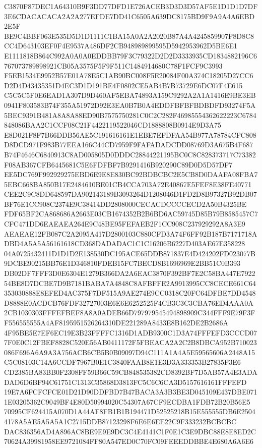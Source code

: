 \documentclass[UTF8,fontset=fandol,zihao=-4,a4paper]{ctexart}
\begin{document}
{{C3870F87DEC1A64310B9F3DD77DFD1E726ACEB3D3D3D57AF5E1D1D1D7DF3E6CDACACACA2A2A277EFDE7DD41C6505A639DC8175BD9F9A9A4A6EBD2E5F
BE9C4BBF063E535D5D1D1111C1BA15A0A2A2020B87A4A4245859907F8D8C8CC4D643103EF0F4E9537A486DF2CB948989899595D5942953962D5BE6E1
E1111818B864C992A0A0A0EDDBB79F3C79322D2D2D3333935CD1834882196C6767073789898921CB05A3575F5F9F511C1484914680C78F1FCF9C3993
F5EB1534E9952B57E01A78E5C1AB90BC008F5E20084F00A374C18205D27CC6D2D4D43435351D4EC3D1D191BE4F0802CE5AB4B7B73729E6DC07F4E615
C5C5C5F0E6EAD1A307D9D460AF5EBA74893A159C9292A2A1A1416E9BE3EB0941F803583B74F355A51972D92E3EA0B7B0A4EDDFBFBFBDBDFD93274F5A
5BEC9391B481A8A8A88ED90B7575750281C0C2C282F46985554362622223C6784848086BAA2C1CCF08C21F4422119522046CD1888808B0914E9D3A75
E8D021F8F7B66DDB56AE5C191616161E1EBE7EFDFAA54B977A78784CFC808D8DCD971F983B77EEA166C44CD7959F9FAFADADCDD08769D3A675B4F687
B74F4646C6840913C8AD005805D0DDDC28844221195BC0C8C828373717C73382F08AB367CFB6445681C5E6FDFBF7B9291416B920290C89D0D5D57DF7
EE5DC769F992929275EBD6E9E8E830BC92BDBCBC2E5CB8D0DAAFA08FBA75EBC668BA850B17E2484610BE01CB4CCA703A72E40867E5FEF8E38FE40771
CEE2C9C8DD648597DA902143189B3093264D1208046D1FD2D8B97327B92DB07BF76E1CC908C2374E9C38414DD2808000CECACDCCCCECD2A50B4325BE
FDF65BF2CA868686A2663E03CB1674352B2B6BD6AC59745D85B79B8585457C7CFC471DD6EAEAEA264E9C48BE95FEFAEB2F1CC908C237929292A8A3E9
AEAEAE12FB087C2A2095A417D2800103C880CFD3A74F6FF92B187B7171718ADBD4A5A5A56161618CD368DADADAC1C1C16206B6227D403AE67E358228
04A0725432411D1D1D2E138530DC195ACE65DDB871837E4D424202FD023077B9DCBE90215BB76E1D346810FDEB15FC7BECD8B1696969E2BB51C0B393
DB02DF7FFF3D0E6304E1279B366DA2A6EAC3870F392BF7E2C58BA447E792254BE8D7DCBE7D9B7181BABA7A4848C8AFBFFE2A9913995CC8CECE661C64
353030888E8EFED4AC375F7DF515A9AE274E9CC0318C20FC64DFBE7DD4548D8888E0ACDCB76FDF32727003E6E6E6252525F4CB3C3C3CBA76ED4AAA0A
2CB1030303FFFEFBEF8A8A0ADEB66D797979545494898909C344FFF9E79F3FF556555555A4AF8195951526264310DE221289A8433E8B162DE2B2686A
4F95BE5E7EF6EC19E3B23FFFFC1316D1ADB9300C1D3A74FFFEFD3CCCD077F0E0C12FBEF8828C520E56AB0411172F5FBEACA2A2C2B8DBCA952B710023
086F696A6A9A3A756ACB6CB5B0B09097D94C111A1A4A5E59565606A2448A15C5C08103C14A6CCDF7967B0E1C3840FAAB8E1E3D3A333353B27835F3E6
CD2385BA83BB0F2308FF59B66C59CB848535382CD8392BF7D5AB57A4E3ADADAD6D6BF94C61751C1313C35868D3813FC5C6C6CA3D5157616161FFFEFD
19E7A6FCFCFCE01D21D90DDFBD7B47BACA3A3B3BE3D045109E437DBE0711E03205362C9049BF4E80D50994020C54307A67CF9ECDBA1FDB72B20B56E5
70995CF624415A070D1A44AF8FB1B1B194471D52525218B15E555555DB6E25044178A5AE5A5A5A1C2715DDB87123298F6E6E6EE22C9F333232BCBCBC
DAC836356AD4A896AC8BE9E9E9DC3C4E4141C1F0E1C3E9DBC88E8E8ED2C70624A39981958EE9721084FF80A547ED0C70FC09FEEEDDBBE4E680A6A6E6
}}
\end{document}
